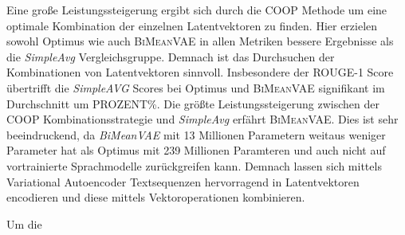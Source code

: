 Eine große Leistungssteigerung ergibt sich durch die COOP Methode um eine optimale Kombination der einzelnen Latentvektoren zu finden.
Hier erzielen sowohl Optimus wie auch \textsc{BiMeanVAE} in allen Metriken bessere Ergebnisse als die \textit{SimpleAvg} Vergleichsgruppe.
Demnach ist das Durchsuchen der Kombinationen von Latentvektoren sinnvoll. 
Insbesondere der ROUGE-1 Score übertrifft die \textit{SimpleAVG} Scores bei Optimus und \textsc{BiMeanVAE} signifikant im Durchschnitt um PROZENT\%.
Die größte Leistungssteigerung zwischen der COOP Kombinationsstrategie und \textit{SimpleAvg} erfährt \textsc{BiMeanVAE}.
Dies ist sehr beeindruckend, da \textit{BiMeanVAE} mit 13 Millionen Parametern weitaus weniger Parameter hat als Optimus mit 239 Millionen Paramteren und auch nicht auf vortrainierte Sprachmodelle zurückgreifen kann.
Demnach lassen sich mittels Variational Autoencoder Textsequenzen hervorragend in Latentvektoren encodieren und diese mittels Vektoroperationen kombinieren.


Um die 




\pagebreak

